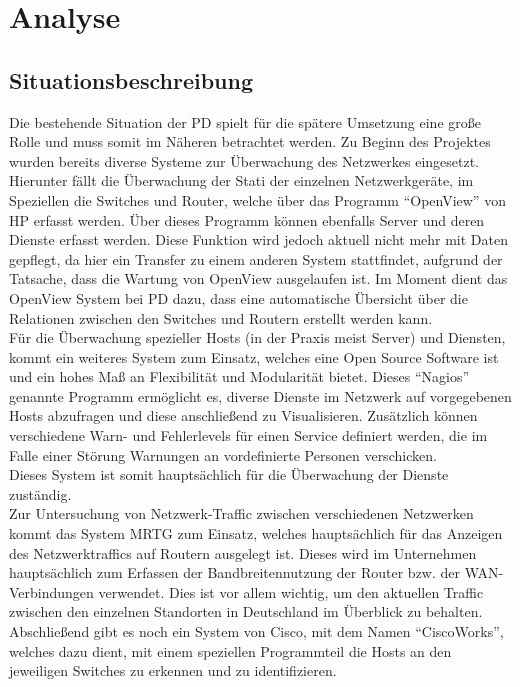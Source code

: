 \chapter{Analyse}
\label{cha:analyse}

\section{Situationsbeschreibung}
\label{sec:situation}

Die bestehende Situation der PD spielt für die spätere Umsetzung eine große Rolle und muss somit im Näheren betrachtet werden.
Zu Beginn des Projektes wurden bereits diverse Systeme zur Überwachung des Netzwerkes eingesetzt. Hierunter fällt die Überwachung der Stati der einzelnen Netzwerkgeräte, im Speziellen die Switches und Router, welche über das Programm “OpenView” von HP erfasst werden. Über dieses Programm können ebenfalls Server und deren Dienste erfasst werden. Diese Funktion wird jedoch aktuell nicht mehr mit Daten gepflegt, da hier ein Transfer zu einem anderen System stattfindet, aufgrund der Tatsache, dass die Wartung von OpenView ausgelaufen ist. Im Moment dient das OpenView System bei PD dazu, dass eine automatische Übersicht über die Relationen zwischen den Switches und Routern erstellt werden kann.\\
Für die Überwachung spezieller Hosts (in der Praxis meist Server) und Diensten, kommt ein weiteres System zum Einsatz, welches eine Open Source Software ist und ein hohes Maß an Flexibilität und Modularität bietet. Dieses “Nagios” genannte Programm ermöglicht es, diverse Dienste im Netzwerk auf vorgegebenen Hosts abzufragen und diese anschließend zu Visualisieren.
Zusätzlich können verschiedene Warn- und Fehlerlevels für einen Service definiert werden, die im Falle einer Störung Warnungen an vordefinierte Personen verschicken.\\
Dieses System ist somit hauptsächlich für die Überwachung der Dienste zuständig.\\
Zur Untersuchung von Netzwerk-Traffic zwischen verschiedenen Netzwerken kommt das System MRTG zum Einsatz, welches hauptsächlich für das Anzeigen des Netzwerktraffics auf Routern ausgelegt ist.
Dieses wird im Unternehmen hauptsächlich zum Erfassen der Bandbreitennutzung der Router bzw. der WAN-Verbindungen verwendet.
Dies ist vor allem wichtig, um den aktuellen Traffic zwischen den einzelnen Standorten in Deutschland im Überblick zu behalten.\\
Abschließend gibt es noch ein System von Cisco, mit dem Namen “CiscoWorks”, welches dazu dient, mit einem speziellen Programmteil die Hosts an den jeweiligen Switches zu erkennen und zu identifizieren.
